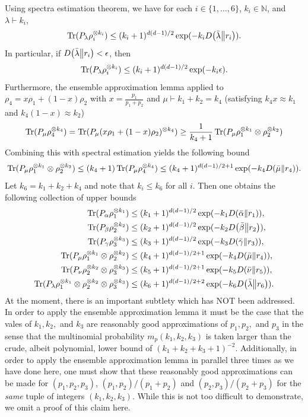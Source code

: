 \documentclass[notitlepage, 10pt]{article}
\begin{document}
Using spectra estimation theorem, we have for each $i \in \{1, \ldots, 6\}$, $k_i \in \mathbb N$, and $\lambda \vdash k_i$,
\begin{equation}
    \operatorname{Tr}(P_{\lambda} \rho_i^{\otimes k_i}) \leq (k_i + 1)^{d(d-1)/2} \exp(-k_i D\!\left(\bar \lambda\middle\|r_i\right)).
\end{equation}
In particular, if $D\!\left(\bar \lambda\middle\|r_i\right) < \epsilon$, then
\begin{equation}
    \operatorname{Tr}(P_{\lambda} \rho_i^{\otimes k_i}) \leq (k_i + 1)^{d(d-1)/2} \exp(-k_i \epsilon).
\end{equation}
Furthermore, the ensemble approximation lemma applied to $\rho_{4} = x \rho_1 + (1-x) \rho_2$ with $x = \frac{p_1}{p_1+p_2}$ and $\mu \vdash k_1 + k_2 = k_4$ (satisfying $k_4 x \approx k_1$ and $k_4 (1-x) \approx k_2$) 
\begin{equation}
    \operatorname{Tr}(P_{\mu} \rho_4^{\otimes k_4}) = \operatorname{Tr}(P_{\mu} (x \rho_1 + (1-x) \rho_2)^{\otimes k_4}) \geq \frac{1}{k_4 + 1}\operatorname{Tr}(P_{\mu} \rho_1^{\otimes k_1} \otimes \rho_2^{\otimes k_2})
\end{equation}
Combining this with spectral estimation yields the following bound
\begin{equation}
    \operatorname{Tr}(P_{\mu} \rho_1^{\otimes k_1} \otimes \rho_2^{\otimes k_2}) \leq (k_4 + 1) \operatorname{Tr}(P_{\mu} \rho_4^{\otimes k_4}) \leq (k_4+1)^{d(d-1)/2+1} \exp(-k_4 D\!\left(\bar \mu\middle\|r_4\right)).
\end{equation}
Let $k_6 = k_1 + k_2 + k_4$ and note that $k_i \leq k_6$ for all $i$.
Then one obtains the following collection of upper bounds
\begin{align}
    \operatorname{Tr}(P_{\alpha} \rho_1^{\otimes k_1}) &\leq (k_1 + 1)^{d(d-1)/2} \exp(-k_1 D\!\left(\bar \alpha\middle\|r_1\right)), \\
    \operatorname{Tr}(P_{\beta} \rho_2^{\otimes k_2}) &\leq (k_2 + 1)^{d(d-1)/2} \exp(-k_2 D\!\left(\bar \beta\middle\|r_2\right)), \\
    \operatorname{Tr}(P_{\gamma} \rho_3^{\otimes k_3}) &\leq (k_3 + 1)^{d(d-1)/2} \exp(-k_3 D\!\left(\bar \gamma\middle\|r_3\right)), \\
    \operatorname{Tr}(P_{\mu} \rho_1^{\otimes k_1} \otimes \rho_2^{\otimes k_2}) &\leq (k_4+1)^{d(d-1)/2+1} \exp(-k_4 D\!\left(\bar \mu\middle\|r_4\right)), \\
    \operatorname{Tr}(P_{\nu} \rho_2^{\otimes k_2} \otimes \rho_3^{\otimes k_3}) &\leq (k_5+1)^{d(d-1)/2+1} \exp(-k_5 D\!\left(\bar \nu\middle\|r_5\right)), \\
    \operatorname{Tr}(P_{\lambda} \rho_1^{\otimes k_1} \otimes \rho_2^{\otimes k_2} \otimes \rho_3^{\otimes k_3}) &\leq (k_6+1)^{d(d-1)/2+2} \exp(-k_6 D\!\left(\bar \lambda\middle\|r_6\right)).
\end{align}
At the moment, there is an important subtlety which has NOT been addressed.
In order to apply the ensemble approximation lemma it must be the case that the vales of $k_1, k_2,$ and $k_3$ are reasonably good approximations of $p_1, p_2,$ and $p_3$ in the sense that the multinomial probability $m_{p}(k_1, k_2, k_3)$ is taken larger than the crude, albeit polynomial, lower bound of $(k_1+k_2+k_3+1)^{-2}$.
Additionally, in order to apply the ensemble approximation lemma in parallel three times as we have done here, one must show that these reasonably good approximations can be made for $(p_1, p_2, p_3)$, $(p_1, p_2)/(p_1+p_2)$ and $(p_2, p_3)/(p_2+p_3)$ for the \textit{same} tuple of integers $(k_1, k_2, k_3)$.
While this is not too difficult to demonstrate, we omit a proof of this claim here.
\end{document}
